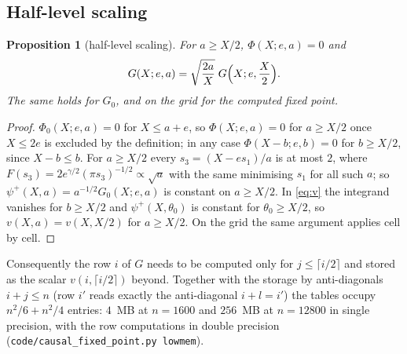 \documentclass[11pt]{amsart}
\newtheorem{proposition}[theorem]{Proposition}
\theoremstyle{remark}
\begin{document}
\subsection{Half-level scaling}
\begin{proposition}[half-level scaling]\label{prop:half}
For $a\ge X/2$, $\Phi(X;e,a)=0$ and
\[
G(X;e,a)=\sqrt{\frac{2a}{X}}\;G\Bigl(X;e,\frac X2\Bigr).
\]
The same holds for $G_0$, and on the grid for the computed fixed point.
\end{proposition}
\begin{proof}
$\Phi_0(X;e,a)=0$ for $X\le a+e$, so $\Phi(X;e,a)=0$ for $a\ge X/2$ once $X\le 2e$ is excluded by the definition; in any case $\Phi(X-b;e,b)=0$ for $b\ge X/2$, since $X-b\le b$. For $a\ge X/2$ every $s_3=(X-es_1)/a$ is at most $2$, where $F(s_3)=2e^{\gamma/2}(\pi s_3)^{-1/2}\propto\sqrt a$ with the same minimising $s_1$ for all such $a$; so $\psi^+(X,a)=a^{-1/2}G_0(X;e,a)$ is constant on $a\ge X/2$. In \eqref{eq:v} the integrand vanishes for $b\ge X/2$ and $\psi^+(X,\theta_0)$ is constant for $\theta_0\ge X/2$, so $v(X,a)=v(X,X/2)$ for $a\ge X/2$. On the grid the same argument applies cell by cell.
\end{proof}
Consequently the row $i$ of $G$ needs to be computed only for $j\le\lceil i/2\rceil$ and stored as the scalar $v(i,\lceil i/2\rceil)$ beyond. Together with the storage by anti-diagonals $i+j\le n$ (row $i'$ reads exactly the anti-diagonal $i+l=i'$) the tables occupy $n^2/6+n^2/4$ entries: $4$~MB at $n=1600$ and $256$~MB at $n=12800$ in single precision, with the row computations in double precision (\texttt{code/causal\_fixed\_point.py lowmem}).
\end{document}
